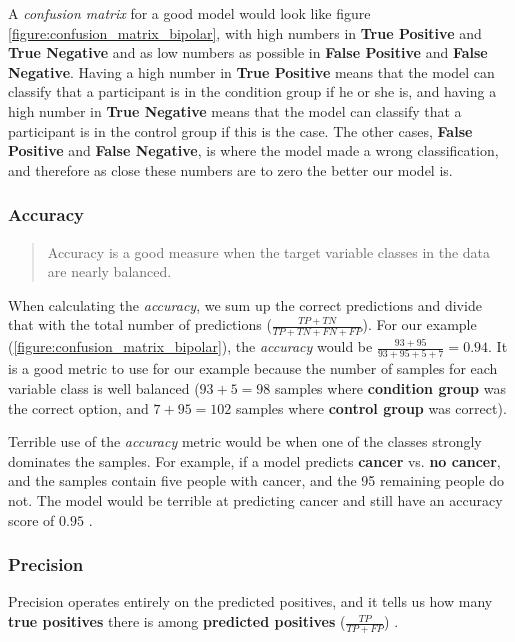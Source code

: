 A \textit{confusion matrix} for a good model would look like figure \ref{figure:confusion_matrix_bipolar}, with high numbers in \textbf{True Positive} and \textbf{True Negative} and as low numbers as possible in \textbf{False Positive} and \textbf{False Negative}. Having a high number in \textbf{True Positive} means that the model can classify that a participant is in the condition group if he or she is, and having a high number in \textbf{True Negative} means that the model can classify that a participant is in the control group if this is the case. The other cases, \textbf{False Positive} and \textbf{False Negative}, is where the model made a wrong classification, and therefore as close these numbers are to zero the better our model is.

\subsubsection{Accuracy}

\blockquote[\cite{ml_metrics}]{Accuracy is a good measure when the target variable classes in the data are nearly balanced.}

When calculating the \textit{accuracy}, we sum up the correct predictions and divide that with the total number of predictions ($ \frac{TP + TN}{TP + TN + FN + FP} $). For our example (\ref{figure:confusion_matrix_bipolar}), the \textit{accuracy} would be $ \frac{93 + 95}{93 + 95 + 5 + 7} = 0.94 $. It is a good metric to use for our example because the number of samples for each variable class is well balanced ($ 93+5=98 $ samples where \textbf{condition group} was the correct option, and $ 7+95=102 $ samples where \textbf{control group} was correct).

Terrible use of the \textit{accuracy} metric would be when one of the classes strongly dominates the samples. For example, if a model predicts \textbf{cancer} vs. \textbf{no cancer}, and the samples contain five people with cancer, and the 95 remaining people do not. The model would be terrible at predicting cancer and still have an accuracy score of $ 0.95 $ \cite{ml_metrics}.

\subsubsection{Precision} 

Precision operates entirely on the predicted positives, and it tells us how many \textbf{true positives} there is among \textbf{predicted positives} ($ \frac{TP}{TP + FP} $) \cite{ml_metrics}. 

